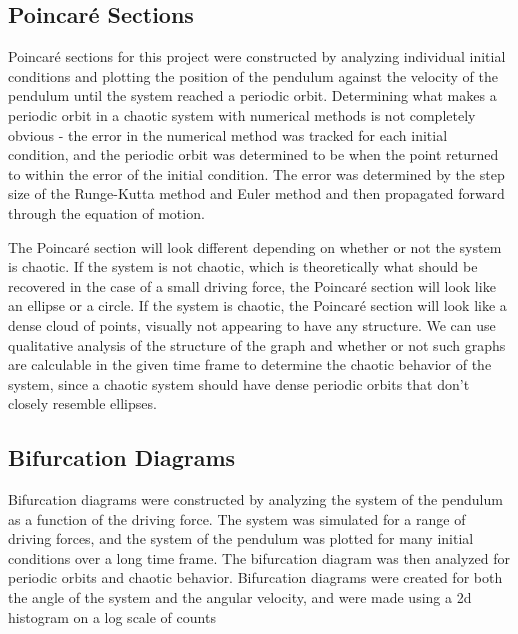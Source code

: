 \documentclass[11pt]{article} %
\begin{document}
    \subsection{Poincar\'e Sections}
        Poincar\'e sections for this project were constructed by analyzing individual initial conditions and plotting the position
        of the pendulum against the velocity of the pendulum until the system reached a periodic orbit.  Determining what makes
        a periodic orbit in a chaotic system with numerical methods is not completely obvious - the error in the numerical method
        was tracked for each initial condition, and the periodic orbit was determined to be when the point returned to within the
        error of the initial condition. The error was determined by the step size of the Runge-Kutta method and Euler method and then
        propagated forward through the equation of motion.\\\vspace{3mm}

        The Poincar\'e section will look different depending on whether or not the system is chaotic. If the system is not chaotic,
        which is theoretically what should be recovered in the case of a small driving force, the Poincar\'e section will look like
        an ellipse or a circle. If the system is chaotic, the Poincar\'e section will look like a dense cloud of points, visually
        not appearing to have any structure. We can use qualitative analysis of the structure of the graph and whether or not such
        graphs are calculable in the given time frame to determine the chaotic behavior of the system, since a chaotic system should
        have dense periodic orbits that don't closely resemble ellipses.\\
    \subsection{Bifurcation Diagrams}
        Bifurcation diagrams were constructed by analyzing the system of the pendulum as a function of the driving force. The system
        was simulated for a range of driving forces, and the system of the pendulum was plotted for many initial conditions over a 
        long time frame. The bifurcation diagram was then analyzed for periodic orbits and chaotic behavior. Bifurcation diagrams were
        created for both the angle of the system and the angular velocity, and were made using a 2d histogram on a log scale of counts\\\vspace{3mm}
\end{document}
